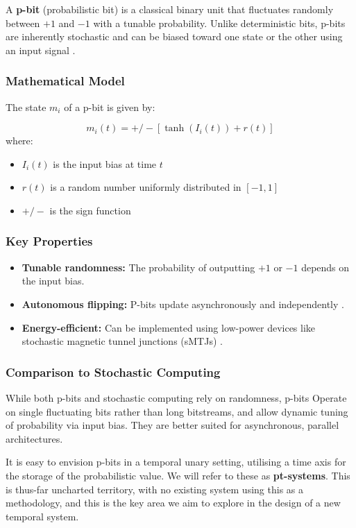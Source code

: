 \documentclass{article}
\begin{document}
A \textbf{p-bit} (probabilistic bit) is a classical binary unit that fluctuates randomly between $+1$ and $-1$ with a tunable probability. Unlike deterministic bits, p-bits are inherently stochastic and can be biased toward one state or the other using an input signal \cite{camsari2017stochastic}.

\subsubsection{Mathematical Model}
The state $m_i$ of a p-bit is given by:

\begin{equation}
	m_i(t) = +/- [\tanh(I_i(t)) + r(t)]
\end{equation}
where:
\begin{itemize}
  \item $I_i(t)$ is the input bias at time $t$
  \item $r(t)$ is a random number uniformly distributed in $[-1, 1]$
  \item $+/-$ is the sign function
\end{itemize}

\subsubsection{Key Properties}
\begin{itemize}
  \item \textbf{Tunable randomness:} The probability of outputting $+1$ or $-1$ depends on the input bias.
  \item \textbf{Autonomous flipping:} P-bits update asynchronously and independently \cite{camsari2019petaflips}.
  \item \textbf{Energy-efficient:} Can be implemented using low-power devices like stochastic magnetic tunnel junctions (sMTJs) \cite{camsari2023fullstack}.
\end{itemize}

\subsubsection{Comparison to Stochastic Computing}
While both p-bits and stochastic computing rely on randomness, p-bits  Operate on single fluctuating bits rather than long bitstreams, and allow dynamic tuning of probability via input bias. They are better suited for asynchronous, parallel architectures.

It is easy to envision p-bits in a temporal unary setting, utilising a time axis for the storage of the probabilistic value. We will refer to these as \textbf{pt-systems}. This is thus-far uncharted territory, with no existing system using this as a methodology, and this is the key area we aim to explore in the design of a new temporal system.
\end{document}

